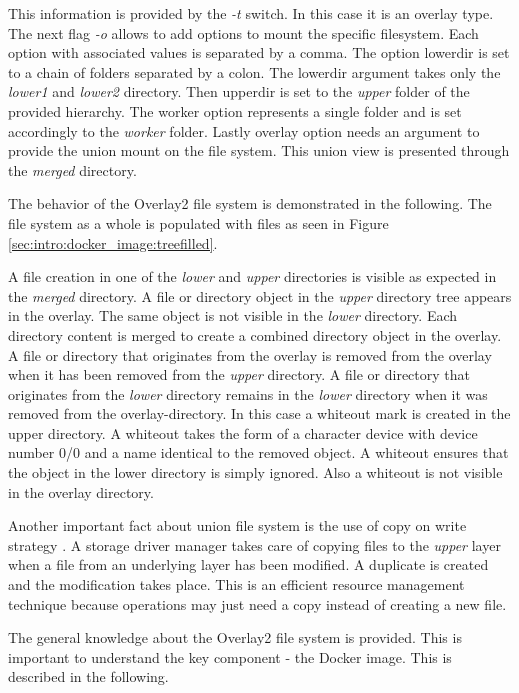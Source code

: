 This information is provided by the \textit{-t} switch. In this case it is an overlay type. 
The next flag \textit{-o} allows to add options to mount the specific filesystem.
Each option with associated values is separated by a comma.
The option lowerdir is set to a chain of folders separated by a colon. 
The lowerdir argument takes only the \textit{lower1} and \textit{lower2} directory. 
Then upperdir is set to the \textit{upper} folder of the provided hierarchy. 
The worker option represents a single folder and is set accordingly to the \textit{worker} folder. 
Lastly overlay option needs an argument to provide the union mount on the file system. 
This union view is presented through the \textit{merged} directory.

The behavior of the Overlay2 file system is demonstrated in the following.
The file system as a whole is populated with files as seen in Figure \ref{sec:intro:docker_image:treefilled}.

A file creation in one of the \textit{lower} and \textit{upper} directories is visible as expected in the \textit{merged} directory.
A file or directory object in the \textit{upper} directory tree appears in the overlay. The same object is not visible in the \textit{lower} directory.
Each directory content is merged to create a combined directory object in the overlay.
A file or directory that originates from the overlay is removed from the overlay when it has been removed from the \textit{upper} directory. 
A file or directory that originates from the \textit{lower} directory remains in the \textit{lower} directory when it was removed from the overlay-directory.
In this case a whiteout mark is created in the upper directory. A whiteout takes the form of a character device with device number 0/0 and a name identical to the removed object. 
A whiteout ensures that the object in the lower directory is simply ignored. 
Also a whiteout is not visible in the overlay directory. 

Another important fact about union file system is the use of copy on write strategy \cite{cow}.
A storage driver manager takes care of copying files to the \textit{upper} layer when a file from an underlying layer has been modified. A duplicate is created and the modification takes place. This is an efficient resource management technique because operations may just need a copy instead of creating a new file.
	
The general knowledge about the Overlay2 file system is provided. This is important to understand the key component - the Docker image. This is described in the following.